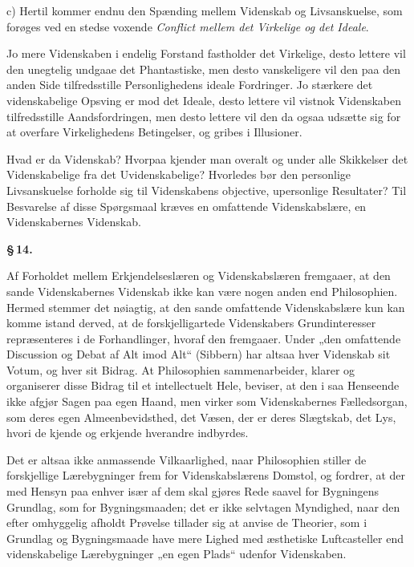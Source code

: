 \documentclass[12pt]{book}
\newcommand{\opage}[1]{\marginnote{\footnotesize\textit{[#1]}}}
\begin{document}
c) Hertil kommer endnu den Spænding mellem Videnskab og Livsanskuelse, som forøges ved
en stedse voxende \emph{Conflict mellem det Virkelige og det Ideale}.

Jo mere Videnskaben i endelig Forstand fastholder det Virkelige, desto lettere vil den
unegtelig undgaae det Phantastiske, men desto vanskeligere vil den paa den anden Side
tilfredsstille Personlighedens ideale Fordringer. Jo stærkere det videnskabelige
Opsving er mod det Ideale, desto lettere vil vistnok Videnskaben tilfredsstille
Aandsfordringen, men desto lettere vil den da ogsaa udsætte sig for at overfare
Virkelighedens Betingelser, og gribes i Illusioner.

Hvad er da Videnskab? Hvorpaa kjender man overalt og under alle Skikkelser det
Videnskabelige fra det Uvidenskabelige? Hvorledes bør den personlige Livsanskuelse
forholde sig til Videnskabens objective, upersonlige Resultater? Til Besvarelse af
disse Spørgsmaal kræves en omfattende Videnskabslære, en Videnskabernes Videnskab.

\begin{center}{\bfseries \S\,14.}\end{center}

Af Forholdet mellem Erkjendelseslæren og Videnskabslæren fremgaaer, at den sande
Videnskabernes Videnskab ikke kan være nogen anden end Philosophien. Hermed stemmer det
nøiagtig, at den sande omfattende Videnskabslære kun kan komme istand derved, at de
forskjelligartede Videnskabers Grundinteresser repræsenteres i de Forhandlinger, hvoraf
\opage{72} den fremgaaer. Under „den omfattende Discussion og Debat af Alt imod Alt“ (Sibbern) har
altsaa hver Videnskab sit Votum, og hver sit Bidrag. At Philosophien sammenarbeider,
klarer og organiserer disse Bidrag til et intellectuelt Hele, beviser, at den i saa
Henseende ikke afgjør Sagen paa egen Haand, men virker som Videnskabernes
Fælledsorgan, som deres egen Almeenbevidsthed, det Væsen, der er deres Slægtskab, det
Lys, hvori de kjende og erkjende hverandre indbyrdes.

Det er altsaa ikke anmassende Vilkaarlighed, naar Philosophien stiller de forskjellige
Lærebygninger frem for Videnskabslærens Domstol, og fordrer, at der med Hensyn paa
enhver især af dem skal gjøres Rede saavel for Bygningens Grundlag, som for
Bygningsmaaden; det er ikke selvtagen Myndighed, naar den efter omhyggelig afholdt
Prøvelse tillader sig at anvise de Theorier, som i Grundlag og Bygningsmaade have mere
Lighed med æsthetiske Luftcasteller end videnskabelige Lærebygninger „en egen Plads“
udenfor Videnskaben.
\end{document}
